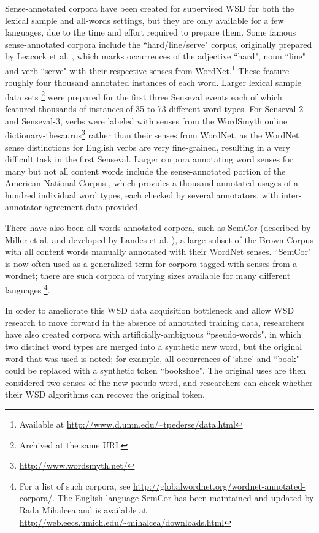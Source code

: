 Sense-annotated corpora have been created for supervised WSD for both the
lexical sample and all-words settings, but they are only available for a few
languages, due to the time and effort required to prepare them.  Some famous
sense-annotated corpora include the ``hard/line/serve" corpus, originally
prepared by Leacock et al.
\cite{Leacock:1993:CSS:1075671.1075730,leacock1998using}, which
marks occurrences of the adjective ``hard", noun ``line" and verb ``serve" with
their respective senses from WordNet.\footnote{Available at
\url{http://www.d.umn.edu/~tpederse/data.html}}
These feature roughly four thousand annotated instances of each word. Larger
lexical sample data sets \footnote{Archived at the same URL} 
were prepared for the first three Senseval events
\cite{Kilgarriff98senseval,
      edmonds-cotton:2001:SENSEVAL,
      mihalcea-chklovski-kilgarriff:2004:Senseval-3}
each of which featured thousands of instances of 35 to 73 different
word types. For Senseval-2 and Senseval-3, verbs were labeled with senses from
the WordSmyth online
dictionary-thesaurus\footnote{\url{http://www.wordsmyth.net/}} rather than
their senses from WordNet, as the WordNet sense distinctions for English verbs
are very fine-grained, resulting in a very difficult task in the first
Senseval.
Larger corpora annotating word senses for many but not all content words
include the sense-annotated portion of the American National Corpus
\cite{passonneau2012masc}, which provides a thousand annotated usages of a
hundred individual word types, each checked by several annotators, with
inter-annotator agreement data provided.

There have also been all-words annotated corpora,
such as SemCor (described by Miller et al.
\cite{Miller:1993:SC:1075671.1075742} and developed by Landes et al.
\cite{landes1998}), a large subset of the Brown Corpus with all
content words manually annotated with their WordNet senses. ``SemCor" is now
often used as a generalized term for corpora tagged with senses from a wordnet;
there are such corpora of varying sizes available for many different
languages \footnote{For a list of such corpora, see
\url{http://globalwordnet.org/wordnet-annotated-corpora/}.
The English-language SemCor has been maintained and updated by Rada Mihalcea
and is available at \url{http://web.eecs.umich.edu/~mihalcea/downloads.html}}.

In order to ameliorate this WSD data acquisition bottleneck and allow WSD
research to move forward in the absence of annotated training data, researchers
have also created corpora with artificially-ambiguous ``pseudo-words", in which
two distinct word types are merged into a synthetic new word, but the original
word that was used is noted; for example, all occurrences of `shoe' and ``book"
could be replaced with a synthetic token ``bookshoe".  The original uses are
then considered two senses of the new pseudo-word, and researchers can check
whether their WSD algorithms can recover the original token.

